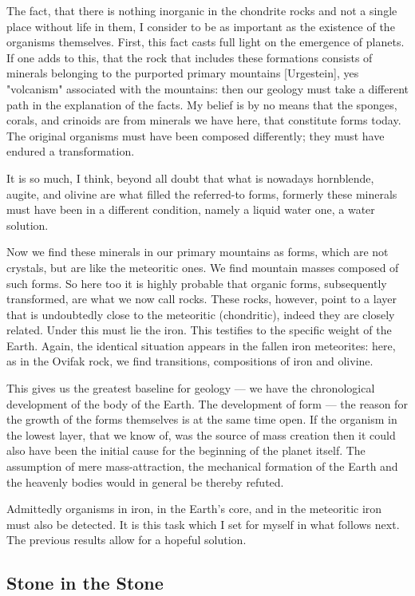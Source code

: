 \documentclass[a4paper, 12pt, oneside]{article}
\begin{document}
The fact, that there is nothing inorganic in the chondrite rocks and not a single place without life in them, I consider to be as important as the existence of the organisms themselves. First, this fact casts full light on the emergence of planets. If one adds to this, that the rock that includes these formations consists of minerals belonging to the purported primary mountains [Urgestein], yes "volcanism" associated with the mountains: then our geology must take a different path in the explanation of the facts. My belief is by no means that the sponges, corals, and crinoids are from minerals we have here, that constitute forms today. The original organisms must have been composed differently; they must have endured a transformation.

It is so much, I think, beyond all doubt that what is nowadays hornblende, augite, and olivine are what filled the referred-to forms, formerly these minerals must have been in a different condition, namely a liquid water one, a water solution.

Now we find these minerals in our primary mountains as forms, which are not crystals, but are like the meteoritic ones. We find mountain masses composed of such forms. So here too it is highly probable that organic forms, subsequently transformed, are what we now call rocks. These rocks, however, point to a layer that is undoubtedly close to the meteoritic (chondritic), indeed they are closely related. Under this must lie the iron. This testifies to the specific weight of the Earth. Again, the identical situation appears in the fallen iron meteorites: here, as in the Ovifak rock, we find transitions, compositions of iron and olivine.

This gives us the greatest baseline for geology — we have the chronological development of the body of the Earth. The development of form — the reason for the growth of the forms themselves is at the same time open. If the organism in the lowest layer, that we know of, was the source of mass creation then it could also have been the initial cause for the beginning of the planet itself. The assumption of mere mass-attraction, the mechanical formation of the Earth and the heavenly bodies would in general be thereby refuted.

Admittedly organisms in iron, in the Earth's core, and in the meteoritic iron must also be detected. It is this task which I set for myself in what follows next. The previous results allow for a hopeful solution.
\clearpage
\subsection{Stone in the Stone}
\end{document}

